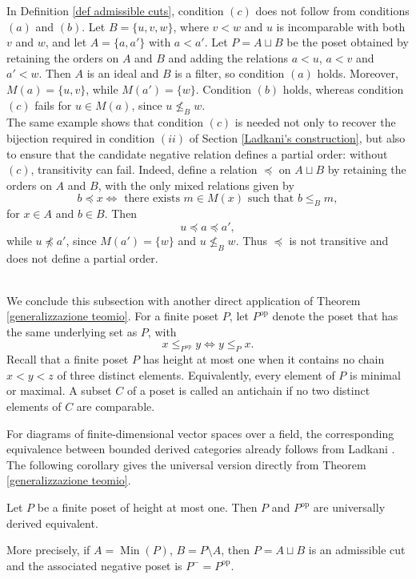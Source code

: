 \begin{remark}
    In Definition \ref{def admissible cuts}, condition $(c)$ does not follow from conditions $(a)$ and $(b)$. Let $B=\{u,v,w\}$, where $v < w$ and $u$ is incomparable with both $v$ and $w$, and let $A=\{a,a'\}$ with $a <a'$. Let $P=A \sqcup B$ be the poset obtained by retaining the orders on $A$ and $B$ and adding the relations $a<u$, $a<v$ and $a'<w$. Then $A$ is an ideal and $B$ is a filter, so condition $(a)$ holds. Moreover, $M(a)=\{u,v\}$, while $M(a')=\{w\}$. Condition $(b)$ holds, whereas condition $(c)$ fails for $u \in M(a)$, since $u \not\leq_B w$. 
    \\The same example shows that condition $(c)$ is needed not only to recover the bijection required in condition $(ii)$ of Section \ref{Ladkani's construction}, but also to ensure that the candidate negative relation defines a partial order: without $(c)$, transitivity can fail. Indeed, define a relation $\preceq$ on $A \sqcup B$ by retaining the orders on $A$ and $B$, with the only mixed relations given by \[b \preceq x \iff \text{ there exists } m \in M(x) \text{ such that } b \leq_B m,\] for $x \in A$ and $b \in B$. Then 
    \[u \preceq a \preceq a',\] while $u \npreceq a'$, since $M(a')=\{w\}$ and $u \nleq_Bw$. Thus $\preceq$ is not transitive and does not define a partial order.
\end{remark}
\\[-0.1 cm]
We conclude this subsection with another direct application of Theorem \ref{generalizzazione teomio}. For a finite poset $P$, let $P^{\operatorname{op}}$ denote the poset that has the same underlying set as $P$, with
\[x \leq_{P^{\operatorname{op}}}y \iff y \leq_Px.\]
Recall that a finite poset $P$ has height at most one when it contains no chain $x<y<z$ of three distinct elements. Equivalently, every element of $P$ is minimal or maximal.
A subset $C$ of a poset is called an antichain if no two distinct elements of $C$ are comparable.

For diagrams of finite-dimensional vector spaces over a field, the corresponding equivalence between bounded derived categories already follows from Ladkani \cite[Corollary 4.18]{ladkani3}. The following corollary gives the universal version directly from Theorem \ref{generalizzazione teomio}.

\begin{corollary} %
\label{Two-level posets and opposites}
    Let $P$ be a finite poset of height at most one. Then $P$ and $P^{\operatorname{op}}$ are universally derived equivalent.

    More precisely, if $A=\operatorname{Min}(P)$, $B=P \setminus A$, then $P=A \sqcup B$ is an admissible cut and the associated negative poset is $P^-=P^{\operatorname{op}}$. 
\end{corollary}

